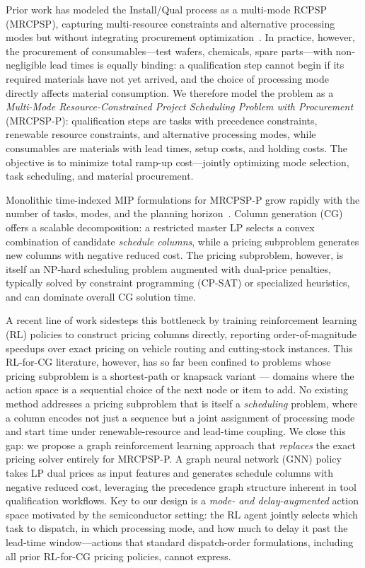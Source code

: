 \documentclass[11pt]{article}
\begin{document}
Prior work has modeled the Install/Qual process as a multi-mode RCPSP (MRCPSP), capturing multi-resource constraints and alternative processing modes but without integrating procurement optimization~\citep{ieee2013semircpsp}.
In practice, however, the procurement of consumables---test wafers, chemicals, spare parts---with non-negligible lead times is equally binding: a qualification step cannot begin if its required materials have not yet arrived, and the choice of processing mode directly affects material consumption.
We therefore model the problem as a \emph{Multi-Mode Resource-Constrained Project Scheduling Problem with Procurement} (MRCPSP-P): qualification steps are tasks with precedence constraints, renewable resource constraints, and alternative processing modes, while consumables are materials with lead times, setup costs, and holding costs.
The objective is to minimize total ramp-up cost---jointly optimizing mode selection, task scheduling, and material procurement.

Monolithic time-indexed MIP formulations for MRCPSP-P grow rapidly with the number of tasks, modes, and the planning horizon~\citep{kone2011milp}.
Column generation (CG) offers a scalable decomposition: a restricted master LP selects a convex combination of candidate \emph{schedule columns}, while a pricing subproblem generates new columns with negative reduced cost.
The pricing subproblem, however, is itself an NP-hard scheduling problem augmented with dual-price penalties, typically solved by constraint programming (CP-SAT) or specialized heuristics, and can dominate overall CG solution time.

A recent line of work sidesteps this bottleneck by training reinforcement learning (RL) policies to construct pricing columns directly, reporting order-of-magnitude speedups over exact pricing on vehicle routing and cutting-stock instances.
This RL-for-CG literature, however, has so far been confined to problems whose pricing subproblem is a shortest-path or knapsack variant --- domains where the action space is a sequential choice of the next node or item to add.
No existing method addresses a pricing subproblem that is itself a \emph{scheduling} problem, where a column encodes not just a sequence but a joint assignment of processing mode and start time under renewable-resource and lead-time coupling.
We close this gap: we propose a graph reinforcement learning approach that \emph{replaces} the exact pricing solver entirely for MRCPSP-P.
A graph neural network (GNN) policy takes LP dual prices as input features and generates schedule columns with negative reduced cost, leveraging the precedence graph structure inherent in tool qualification workflows.
Key to our design is a \emph{mode- and delay-augmented} action space motivated by the semiconductor setting: the RL agent jointly selects which task to dispatch, in which processing mode, and how much to delay it past the lead-time window---actions that standard dispatch-order formulations, including all prior RL-for-CG pricing policies, cannot express.
\end{document}
